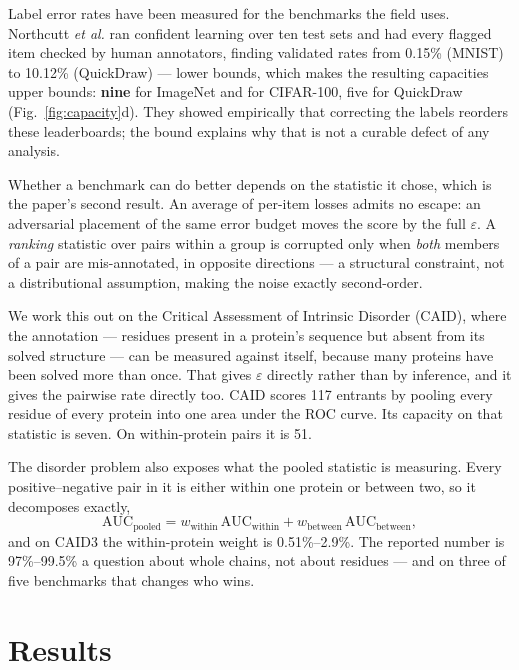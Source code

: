 \documentclass[11pt,a4paper]{article}
\newcommand{\eps}{\varepsilon}
\begin{document}
Label error rates have been measured for the benchmarks the field uses.
Northcutt \emph{et al.}\cite{northcutt} ran confident learning over ten test
sets and had every flagged item checked by human annotators, finding validated
rates from 0.15\% (MNIST) to 10.12\% (QuickDraw) --- lower bounds, which makes
the resulting capacities upper bounds: \textbf{nine} for ImageNet and for
CIFAR-100, five for QuickDraw (Fig.~\ref{fig:capacity}d). They showed
empirically that correcting the labels reorders these leaderboards; the bound
explains why that is not a curable defect of any analysis.

Whether a benchmark can do better depends on the statistic it chose, which is
the paper's second result. An average of per-item losses admits no escape: an
adversarial placement of the same error budget moves the score by the full
$\eps$. A \emph{ranking} statistic over pairs within a group is corrupted only
when \emph{both} members of a pair are mis-annotated, in opposite directions ---
a structural constraint, not a distributional assumption, making the noise
exactly second-order.

We work this out on the Critical Assessment of Intrinsic Disorder
(CAID)\cite{caid1, caid2}, where the annotation --- residues present in a
protein's sequence but absent from its solved structure --- can be measured
against itself, because many proteins have been solved more than once. That
gives $\eps$ directly rather than by inference, and it gives the pairwise rate
directly too. CAID scores 117 entrants by pooling every residue of every protein
into one area under the ROC curve. Its capacity on that statistic is seven. On
within-protein pairs it is 51.

The disorder problem also exposes what the pooled statistic is measuring. Every
positive--negative pair in it is either within one protein or between two, so it
decomposes exactly,
\[
  \mathrm{AUC}_{\text{pooled}}
    = w_{\text{within}}\,\mathrm{AUC}_{\text{within}}
    + w_{\text{between}}\,\mathrm{AUC}_{\text{between}},
\]
and on CAID3 the within-protein weight is 0.51\%--2.9\%. The reported number is
97\%--99.5\% a question about whole chains, not about residues --- and on three
of five benchmarks that changes who wins.

\section*{Results}
\end{document}
